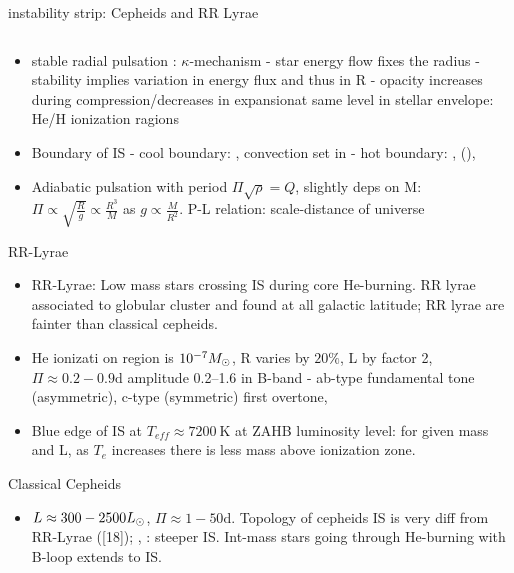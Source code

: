 \begin{frame}{instability strip: Cepheids and RR Lyrae}
\begin{columns}[T]
	\begin{column}{0.65\textwidth}
	\begin{itemize}
	\item stable radial pulsation : $\kappa$-mechanism - star energy flow fixes the radius - stability implies variation in energy flux and thus in R - opacity increases during compression/decreases in expansionat same level in stellar envelope: He/H ionization ragions
    \item Boundary of IS - cool boundary: , convection set in - hot boundary: ,  (), 
    \item Adiabatic pulsation with period $\Pi\sqrt{\rho}=Q$, slightly deps on M: $\Pi\propto \sqrt{\frac{R}{g}}\propto \frac{R^3}{M}$ as $g\propto \frac{M}{R^2}$. P-L relation: scale-distance of universe
\end{itemize}
\begin{block}{RR-Lyrae}
    \begin{itemize}
        \item RR-Lyrae: Low mass stars crossing IS during core He-burning. RR lyrae associated to globular cluster and found at all galactic latitude; RR lyrae are fainter than classical cepheids.
			\item He ionizati on region is $\num{e-7}M_{\odot}$, R varies by $20\%$, L by factor 2, $\Pi\approx0.2-0.9\si{\day}$ amplitude \SIrange{0.2}{1.6}{\mag} in B-band - ab-type fundamental tone (asymmetric), c-type (symmetric) first overtone,
            \item Blue edge of IS at $T_{eff}\approx\SI{7200}{\kelvin}$ at ZAHB luminosity level: for given mass and L, as $T_e$ increases there is less mass above ionization zone.
        \end{itemize}
\end{block}
\begin{block}{Classical Cepheids}
    \begin{itemize}
        \item $L\approx300-2500L_{\odot}$, $\Pi\approx1-50\si{\day}$. Topology of cepheids IS is very diff from RR-Lyrae ([18]); , : steeper IS. Int-mass stars going through He-burning with B-loop extends to IS.
        \end{itemize}
\end{block}

\end{column}
\end{columns}
\end{frame}
